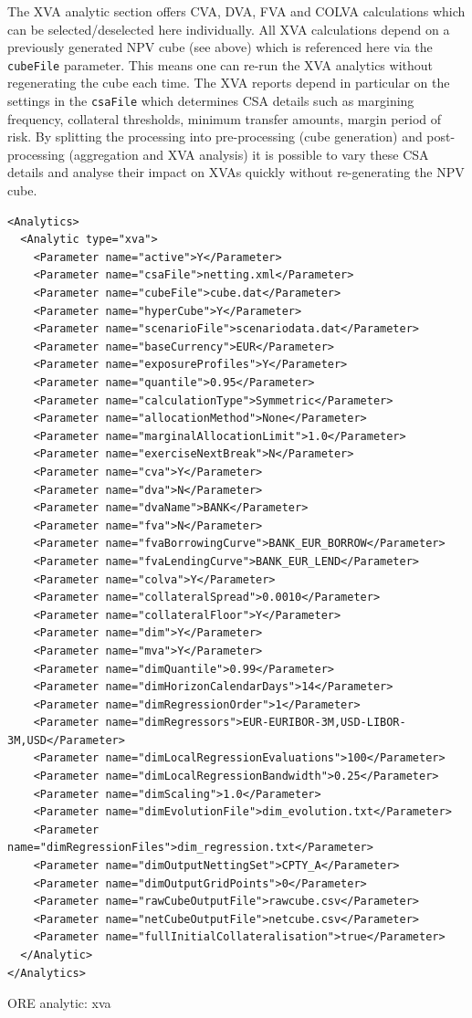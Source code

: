 \documentclass[12pt, a4paper]{article}
\begin{document}
\medskip The XVA analytic section offers CVA, DVA, FVA and COLVA calculations which can be selected/deselected here
individually. All XVA calculations depend on a previously generated NPV cube (see above) which is referenced here via
the {\tt cubeFile} parameter. This means one can re-run the XVA analytics without regenerating the cube each time. The
XVA reports depend in particular on the settings in the {\tt csaFile} which determines CSA details such as margining
frequency, collateral thresholds, minimum transfer amounts, margin period of risk. By splitting the processing into
pre-processing (cube generation) and post-processing (aggregation and XVA analysis) it is possible to vary these CSA
details and analyse their impact on XVAs quickly without re-generating the NPV cube.

\begin{listing}[H]
\begin{verbatim}
<Analytics>
  <Analytic type="xva">
    <Parameter name="active">Y</Parameter>
    <Parameter name="csaFile">netting.xml</Parameter>
    <Parameter name="cubeFile">cube.dat</Parameter>
    <Parameter name="hyperCube">Y</Parameter>
    <Parameter name="scenarioFile">scenariodata.dat</Parameter>
    <Parameter name="baseCurrency">EUR</Parameter>
    <Parameter name="exposureProfiles">Y</Parameter>
    <Parameter name="quantile">0.95</Parameter>
    <Parameter name="calculationType">Symmetric</Parameter>      
    <Parameter name="allocationMethod">None</Parameter>    
    <Parameter name="marginalAllocationLimit">1.0</Parameter>
    <Parameter name="exerciseNextBreak">N</Parameter>
    <Parameter name="cva">Y</Parameter>
    <Parameter name="dva">N</Parameter>
    <Parameter name="dvaName">BANK</Parameter>
    <Parameter name="fva">N</Parameter>
    <Parameter name="fvaBorrowingCurve">BANK_EUR_BORROW</Parameter>
    <Parameter name="fvaLendingCurve">BANK_EUR_LEND</Parameter>
    <Parameter name="colva">Y</Parameter>
    <Parameter name="collateralSpread">0.0010</Parameter>
    <Parameter name="collateralFloor">Y</Parameter>
    <Parameter name="dim">Y</Parameter>
    <Parameter name="mva">Y</Parameter>
    <Parameter name="dimQuantile">0.99</Parameter>
    <Parameter name="dimHorizonCalendarDays">14</Parameter>
    <Parameter name="dimRegressionOrder">1</Parameter>
    <Parameter name="dimRegressors">EUR-EURIBOR-3M,USD-LIBOR-3M,USD</Parameter>
    <Parameter name="dimLocalRegressionEvaluations">100</Parameter>
    <Parameter name="dimLocalRegressionBandwidth">0.25</Parameter>
    <Parameter name="dimScaling">1.0</Parameter>
    <Parameter name="dimEvolutionFile">dim_evolution.txt</Parameter>
    <Parameter name="dimRegressionFiles">dim_regression.txt</Parameter>
    <Parameter name="dimOutputNettingSet">CPTY_A</Parameter>      
    <Parameter name="dimOutputGridPoints">0</Parameter>
    <Parameter name="rawCubeOutputFile">rawcube.csv</Parameter>
    <Parameter name="netCubeOutputFile">netcube.csv</Parameter>
    <Parameter name="fullInitialCollateralisation">true</Parameter>
  </Analytic>
</Analytics>
\end{verbatim}
\caption{ORE analytic: xva}
\label{lst:ore_xva}
\end{listing}
\end{document}
